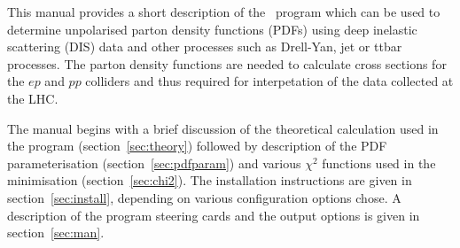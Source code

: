 \label{section:introduction}
This manual provides a short description of the \fitter\ program 
which can be used to determine unpolarised parton density functions 
(PDFs) using deep inelastic scattering (DIS) data and other processes such as 
Drell-Yan, jet or ttbar processes.
The parton density functions are needed to calculate cross sections
for the $ep$ and $pp$ colliders and thus required for interpetation
of the data collected at the LHC.

The manual begins with a brief discussion of the theoretical calculation
used in the program (section~\ref{sec:theory}) followed by description of the
PDF parameterisation (section~\ref{sec:pdfparam}) and various $\chi^2$ functions used in the
minimisation (section~\ref{sec:chi2}). The installation instructions are given in
section~\ref{sec:install}, depending on various configuration options chose. A description of the program steering cards and
the output options is given in section~\ref{sec:man}.

